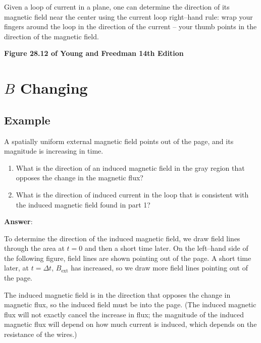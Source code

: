 \documentclass{article}
\begin{document}
Given a loop of current in a plane, one can determine the direction of its magnetic field near the center using the current loop right--hand rule: wrap your fingers around the loop in the direction of the current -- your thumb points in the direction of the magnetic field.



\textbf{Figure 28.12 of Young and Freedman 14th Edition}

\newpage

\section{$B$ Changing}

\subsection{Example}

A spatially uniform external magnetic field points out of the page, and its magnitude is increasing in time.



\begin{enumerate}

  \item What is the direction of an induced magnetic field in the gray region that opposes the change in the magnetic flux?

  \item What is the direction of induced current in the loop that is consistent with the induced magnetic field found in part 1?

\end{enumerate}

{\bf Answer}:

To determine the direction of the induced magnetic field, we draw field lines through the area at $t=0$ and then a short time later. On the left--hand side of the following figure, field lines are shown pointing out of the page. A short time later, at $t=\Delta t$, $B_{\text{ext}}$ has increased, so we draw more field lines pointing out of the page.

The induced magnetic field is in the direction that opposes the change in magnetic flux, so the induced field must be into the page. (The induced magnetic flux will not exactly cancel the increase in flux; the magnitude of the induced magnetic flux will depend on how much current is induced, which depends on the resistance of the wires.)
\end{document}
